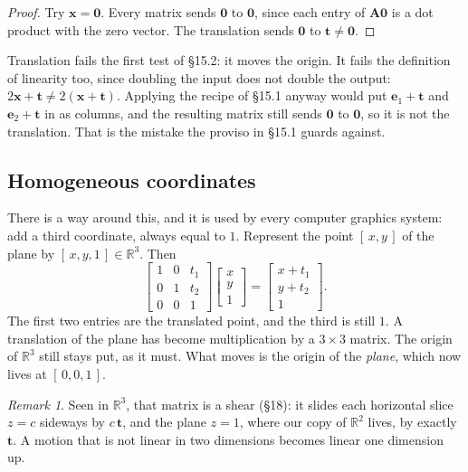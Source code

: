 \documentclass[11pt]{article}
\theoremstyle{plain}
\theoremstyle{definition}
\theoremstyle{remark}
\newtheorem*{rmk}{Remark}
\newcommand{\R}{\mathbb{R}}
\newcommand{\vc}[1]{\mathbf{#1}}
\newcommand{\mt}[1]{\mathbf{#1}}
\begin{document}
\begin{proof}
Try $\vc{x}=\vc{0}$. Every matrix sends $\vc{0}$ to $\vc{0}$, since each entry
of $\mt{A}\vc{0}$ is a dot product with the zero vector. The translation sends
$\vc{0}$ to $\vc{t}\neq\vc{0}$.
\end{proof}

\noindent Translation fails the first test of \S15.2: it moves the origin. It
fails the definition of linearity too, since doubling the input does not double
the output: $2\vc{x}+\vc{t}\neq2(\vc{x}+\vc{t})$. Applying the recipe of
\S15.1 anyway would put $\vc{e}_1+\vc{t}$ and $\vc{e}_2+\vc{t}$ in as columns,
and the resulting matrix still sends $\vc{0}$ to $\vc{0}$, so it is not the
translation. That is the mistake the proviso in \S15.1 guards against.

\subsection{Homogeneous coordinates}
There is a way around this, and it is used by every computer graphics system:
add a third coordinate, always equal to $1$. Represent the point $[\,x,y\,]$ of
the plane by $[\,x,y,1\,]\in\R^{3}$. Then
\[
  \begin{bmatrix} 1&0&t_1\\ 0&1&t_2\\ 0&0&1 \end{bmatrix}
  \begin{bmatrix} x\\ y\\ 1 \end{bmatrix}
  =
  \begin{bmatrix} x+t_1\\ y+t_2\\ 1 \end{bmatrix} .
\]
The first two entries are the translated point, and the third is still $1$. A
translation of the plane has become multiplication by a $3\times3$ matrix. The
origin of $\R^{3}$ still stays put, as it must. What moves is the origin of
the \emph{plane}, which now lives at $[\,0,0,1\,]$.

\begin{rmk}
Seen in $\R^{3}$, that matrix is a shear (\S18): it slides each horizontal
slice $z=c$ sideways by $c\,\vc{t}$, and the plane $z=1$, where our copy of
$\R^{2}$ lives, by exactly $\vc{t}$. A motion that is not linear in two
dimensions becomes linear one dimension up.
\end{rmk}
\end{document}
